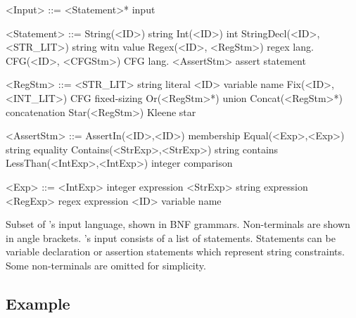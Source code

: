 \begin{Grammar}[H]
    \setlength{\grammarindent}{5em} %
    \begin{grammar}
        <Input> ::= <Statement>*                    \hfill \imss input

        <Statement> ::= String(<ID>)                \hfill string
                \alt Int(<ID>)                      \hfill int
                \alt StringDecl(<ID>, <STR_LIT>)    \hfill string witn value
                \alt Regex(<ID>, <RegStm>)          \hfill regex lang.
                \alt CFG(<ID>, <CFGStm>)            \hfill CFG lang.
                \alt <AssertStm>                    \hfill assert statement

        <RegStm> ::= <STR_LIT>                      \hfill string literal
                \alt <ID>                           \hfill variable name
                \alt Fix(<ID>, <INT_LIT>)           \hfill CFG fixed-sizing
                \alt Or(<RegStm>*)                  \hfill union
                \alt Concat(<RegStm>*)              \hfill concatenation
                \alt Star(<RegStm>)                 \hfill Kleene star

        <AssertStm> ::= AssertIn(<ID>,<ID>)         \hfill membership
                \alt Equal(<Exp>,<Exp>)             \hfill string equality
                \alt Contains(<StrExp>,<StrExp>)    \hfill string contains
                \alt LessThan(<IntExp>,<IntExp>)    \hfill integer comparison

        <Exp> ::= <IntExp>                          \hfill integer expression
                \alt <StrExp>                       \hfill string expression
                \alt <RegExp>                       \hfill regex expression
                \alt <ID>                           \hfill variable name

    \end{grammar}
 \caption{\label{fig:grammar}Subset of \imss's input language, shown in BNF grammars.
 Non-terminals are shown in angle brackets. \imss's input consists of a list of statements.
 Statements can be variable declaration or assertion statements which represent
 string constraints. Some non-terminals are omitted for simplicity.}
 \end{Grammar}

\subsection{Example}

